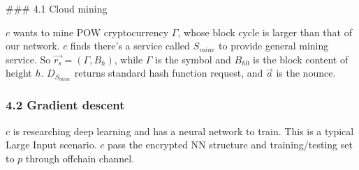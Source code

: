 \documentclass[11pt]{article}
\begin{document}
\#\#\# 4.1 Cloud mining

\(c\) wants to mine POW cryptocurrency \(\Gamma\), whose block cycle is
larger than that of our network. \(c\) finds there's a service called
\(S_{mine}\) to provide general mining service. So
\(\vec{r_s} = (\Gamma, B_h)\), while \(\Gamma\) is the symbol and
\(B_{h0}\) is the block content of height \(h\). \(D_{S_{mine}}\)
returns standard hash function request, and \(\vec{a}\) is the nounce.

\subsubsection{4.2 Gradient descent}\label{gradient-descent}

\(c\) is researching deep learning and has a neural network to train.
This is a typical Large Input scenario. \(c\) pass the encrypted NN
structure and training/testing set to \(p\) through offchain channel.


    
    
    
    
\end{document}
